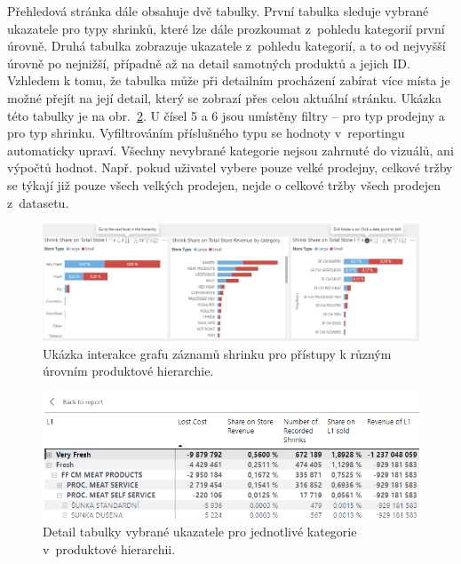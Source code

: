 Přehledová stránka dále obsahuje dvě tabulky. První tabulka sleduje vybrané ukazatele pro typy shrinků, které lze dále prozkoumat z~pohledu kategorií první úrovně. Druhá tabulka zobrazuje ukazatele z~pohledu kategorií, a to od nejvyšší úrovně po nejnižší, případně až na detail samotných produktů a jejich ID. Vzhledem k tomu, že tabulka může při detailním procházení zabírat více místa je možné přejít na její detail, který se zobrazí přes celou aktuální stránku. Ukázka této tabulky je na obr.~\ref*{obr:PBI:tab1}.
U čísel 5 a 6 jsou umístěny filtry -- pro typ prodejny a pro typ shrinku. Vyfiltrováním příslušného typu se hodnoty v~reportingu automaticky upraví. Všechny nevybrané kategorie nejsou zahrnuté do vizuálů, ani výpočtů hodnot. Např. pokud uživatel vybere pouze velké prodejny, celkové tržby se týkají již pouze všech velkých prodejen, nejde o celkové tržby všech prodejen z~datasetu.

\begin{figure}[h!]
    \centering
    \captionsetup{justification=centering}
    \includegraphics[width=\textwidth]{obrazky/PBI/Catdrilldown.png}
    \caption{Ukázka interakce grafu záznamů shrinku pro přístupy k různým úrovním produktové hierarchie.}
    \label{obr:PBI:drill}
\end{figure}

\begin{figure}[h!]
    \centering
    \captionsetup{justification=centering}
    \includegraphics[width=\textwidth]{obrazky/PBI/tabulkaukzka.png}
    \caption{Detail tabulky vybrané ukazatele pro jednotlivé kategorie \\ v~produktové hierarchii.}
    \label{obr:PBI:tab1}
\end{figure}

